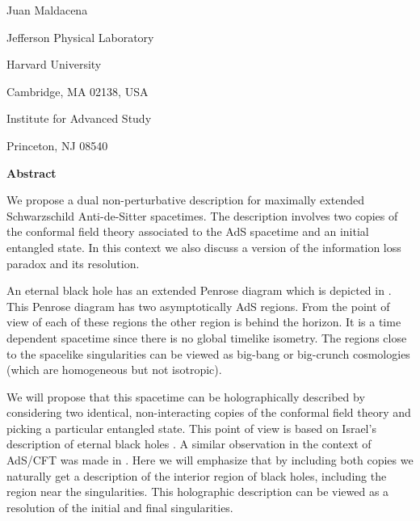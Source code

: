 
\bigskip
\centerline{ Juan Maldacena }
\centerline{ Jefferson Physical Laboratory}
\centerline{Harvard University}
\centerline{Cambridge, MA 02138, USA}
\centerline{ Institute for Advanced Study}
\centerline{Princeton, NJ 08540}

\vskip1in
\centerline{\bf Abstract}
\medskip
We propose a dual non-perturbative description for  maximally 
extended Schwarzschild Anti-de-Sitter spacetimes.
The description involves 
two copies of the conformal field theory associated to the AdS spacetime
and an  initial entangled state. In this context  we 
also discuss a version of the  information loss
paradox  and its resolution. 


\vfill\eject


\ifig{}
{}

 An eternal black hole has an extended Penrose diagram which is 
depicted in  \penrose .  
 This Penrose diagram has two asymptotically 
AdS regions. From the point of view of each of these regions the other
region is behind the horizon. It   is a  time 
dependent spacetime  since there is no global  timelike isometry. 
The regions close to the spacelike singularities can be viewed 
as big-bang or big-crunch cosmologies (which are homogeneous but
not isotropic). 

\tracingnone

 We will  propose that this spacetime
can be holographically described by considering two identical, 
non-interacting copies of the conformal field theory and picking a 
particular entangled state. This point of view is based on 
Israel's description of eternal black holes \israel . 
 A similar observation in the context of AdS/CFT  was made in 
.  
Here we will emphasize that by including both copies
we naturally get a description of the interior region of black holes, 
including the region near the singularities.
This holographic description can be viewed as a resolution of the 
initial and final singularities. 



